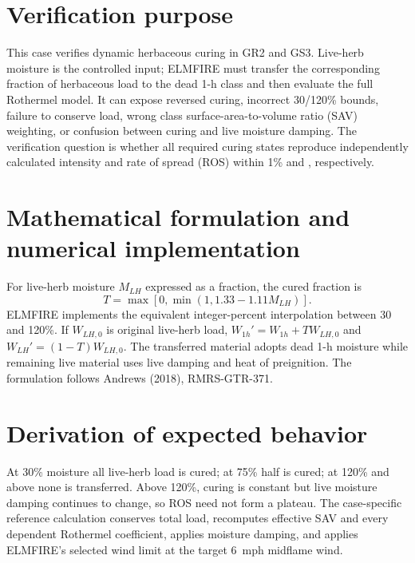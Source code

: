 \section{Verification purpose}

This case verifies dynamic herbaceous curing in GR2 and GS3.  Live-herb moisture is the controlled input; ELMFIRE must transfer the corresponding fraction of herbaceous load to the dead 1-h class and then evaluate the full Rothermel model.  It can expose reversed curing, incorrect 30/120\% bounds, failure to conserve load, wrong class surface-area-to-volume ratio (SAV) weighting, or confusion between curing and live moisture damping.  The verification question is whether all required curing states reproduce independently calculated intensity and rate of spread (ROS) within 1\% and \RosTolerance{}, respectively.

\section{Mathematical formulation and numerical implementation}
For live-herb moisture $M_{LH}$ expressed as a fraction, the cured fraction is
\begin{equation}T=\max[0,\min(1,1.33-1.11M_{LH})].\end{equation}
ELMFIRE implements the equivalent integer-percent interpolation between 30 and 120\%.  If $W_{LH,0}$ is original live-herb load, $W_{1h}'=W_{1h}+TW_{LH,0}$ and $W_{LH}'=(1-T)W_{LH,0}$.  The transferred material adopts dead 1-h moisture while remaining live material uses live damping and heat of preignition.  The formulation follows Andrews (2018), RMRS-GTR-371.

\section{Derivation of expected behavior}
At 30\% moisture all live-herb load is cured; at 75\% half is cured; at 120\% and above none is transferred.  Above 120\%, curing is constant but live moisture damping continues to change, so ROS need not form a plateau.  The case-specific reference calculation conserves total load, recomputes effective SAV and every dependent Rothermel coefficient, applies moisture damping, and applies ELMFIRE's selected wind limit at the target \SI{6}{mph} midflame wind.

